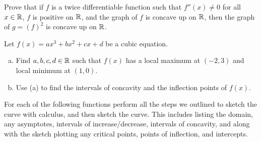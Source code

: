 \question Prove that if $f$ is a twice differentiable function such that $f''(x) \neq 0$ for all $x\in\mathbb{R}$,
$f$ is positive on $\mathbb{R}$, and the graph of $f$ is concave up on $\mathbb{R}$,
then the graph of $g = (f)^2$ is concave up on $\mathbb{R}$.


\question Let $f(x)=ax^3+bx^2+cx+d$ be a cubic equation.
\begin{enumerate}[(a)]
  \item Find $a, b, c, d \in \mathbb{R}$ such that $f(x)$ has a local maximum at $(-2,3)$ and local minimum at $(1,0)$.
  \item Use (a) to find the intervals of concavity and the inflection points of $f(x)$.
\end{enumerate}


\question For each of the following functions perform all the steps we outlined
to sketch the curve with calculus, and then sketch the curve.
This includes listing the domain, any asymptotes, intervals of increase/decrease,
intervals of concavity, and along with the sketch plotting any critical points,
points of inflection, and intercepts.

